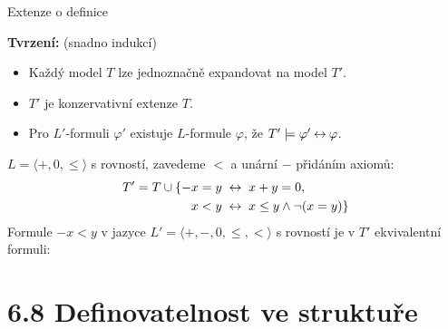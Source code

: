 \documentclass{beamer}
\begin{document}
\begin{frame}{Extenze o definice}


    \medskip
     
    \textbf{Tvrzení:} (snadno indukcí)
     \begin{itemize}
        \item Každý model $T$ lze jednoznačně expandovat na model $T'$.
        \item $T'$ je konzervativní extenze $T$.
        \item Pro $L'$-formuli $\varphi'$ existuje $L$-formule $\varphi$, že $T'\models\varphi'\mathbin{\leftrightarrow}\varphi$.
    \end{itemize} 

    \bigskip

    $L=\langle +,0,\leq\rangle$ s rovností, zavedeme \alert{\large $<$} a unární \alert{\large $-$} přidáním axiomů:
    \begin{align*}
        T'= T\cup\{ -x=y\ &\mathbin{\leftrightarrow}\ x+y=0,\\
        x<y\ &\mathbin{\leftrightarrow}\ x\leq y\land\neg(x=y)\}
    \end{align*}
    Formule \alert{$-x<y$} v jazyce $L'=\langle +,-,0,\leq,<\rangle$ s rovností je v $T'$ ekvivalentní formuli:

\end{frame}


\section{6.8 Definovatelnost ve struktuře}
\end{document}
